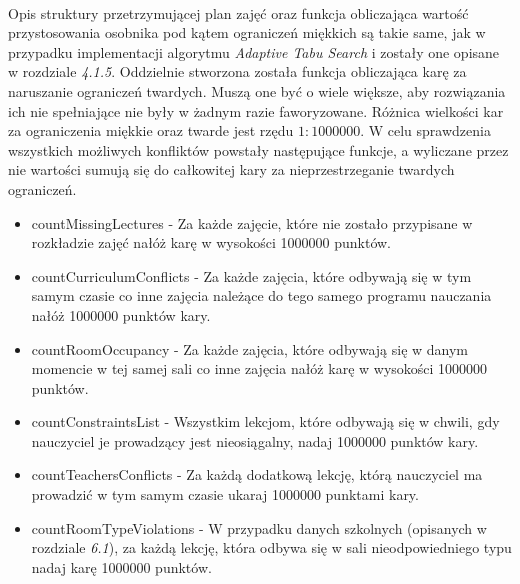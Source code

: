 \paragraph{}Opis struktury przetrzymującej plan zajęć oraz funkcja obliczająca wartość przystosowania osobnika pod kątem ograniczeń miękkich są takie same, jak w przypadku implementacji algorytmu \emph{Adaptive Tabu Search} i zostały one opisane w rozdziale \emph{4.1.5}. Oddzielnie stworzona została funkcja obliczająca karę za naruszanie ograniczeń twardych. Muszą one być o wiele większe, aby rozwiązania ich nie spełniające nie były w żadnym razie faworyzowane\cite{ga2003}. Różnica wielkości kar za ograniczenia miękkie oraz twarde jest rzędu $1:1000000$. W celu sprawdzenia wszystkich możliwych konfliktów powstały następujące funkcje, a wyliczane przez nie wartości sumują się do całkowitej kary za nieprzestrzeganie twardych ograniczeń.
\begin{itemize}
\item{countMissingLectures} - Za każde zajęcie, które nie zostało przypisane w rozkładzie zajęć nałóż karę w wysokości 1000000 punktów.
\item{countCurriculumConflicts} - Za każde zajęcia, które odbywają się w tym samym czasie co inne zajęcia należące do tego samego programu nauczania nałóż 1000000 punktów kary.
\item{countRoomOccupancy} - Za każde zajęcia, które odbywają się w danym momencie w tej samej sali co inne zajęcia nałóż karę w wysokości 1000000 punktów.
\item{countConstraintsList} - Wszystkim lekcjom, które odbywają się w chwili, gdy nauczyciel je prowadzący jest nieosiągalny, nadaj 1000000 punktów kary.
\item{countTeachersConflicts} - Za każdą dodatkową lekcję, którą nauczyciel ma prowadzić w tym samym czasie ukaraj 1000000 punktami kary.
\item{countRoomTypeViolations} - W przypadku danych szkolnych (opisanych w rozdziale \emph{6.1}), za każdą lekcję, która odbywa się w sali nieodpowiedniego typu nadaj karę 1000000 punktów.
\end{itemize}